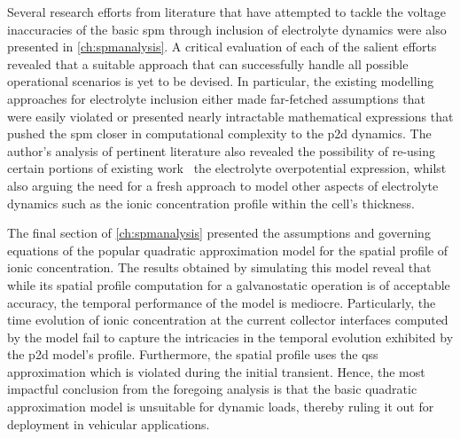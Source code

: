 
Several  research efforts  from literature  that  have attempted  to tackle  the
voltage inaccuracies  of the  basic \gls{spm}  through inclusion  of electrolyte
dynamics were also presented in  \cref{ch:spmanalysis}. A critical evaluation of
each  of  the  salient  efforts  revealed that  a  suitable  approach  that  can
successfully handle all possible operational scenarios  is yet to be devised. In
particular, the  existing modelling approaches for  electrolyte inclusion either
made  far-fetched assumptions  that  were easily  violated  or presented  nearly
intractable  mathematical  expressions  that  pushed  the  \gls{spm}  closer  in
computational complexity  to the  \gls{p2d} dynamics.  The author's analysis  of
pertinent literature  also  revealed  the  possibility of  re-using  certain
portions  of existing work \eg~the electrolyte  overpotential expression, whilst
also arguing the need  for a fresh  approach to model  other aspects of
electrolyte dynamics such as the ionic concentration profile within the cell's
thickness.

The  final  section  of  \cref{ch:spmanalysis}  presented  the  assumptions  and
governing equations of the popular quadratic approximation model for the spatial
profile of  ionic concentration. The  results obtained by simulating  this model
reveal that while its spatial  profile computation for a galvanostatic operation
is of  acceptable accuracy, the temporal  performance of the model  is mediocre.
Particularly, the time evolution of ionic concentration at the current collector
interfaces computed by the model fail to capture the intricacies in the temporal
evolution exhibited by  the \gls{p2d} model's profile.  Furthermore, the spatial
profile uses  the \gls{qss} approximation  which is violated during  the initial
transient. Hence, the  most impactful conclusion from the  foregoing analysis is
that the  basic quadratic approximation  model is unsuitable for  dynamic loads,
thereby ruling it out for deployment in vehicular applications.

